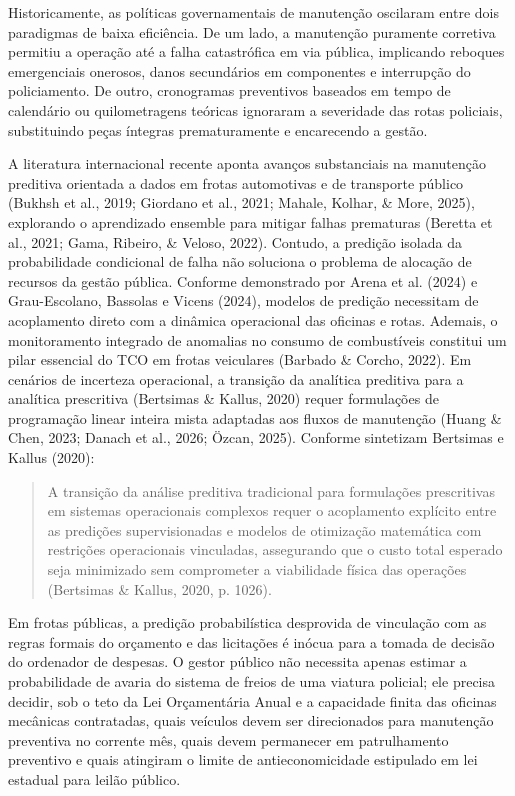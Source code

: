 \documentclass[12pt,a4paper]{article}
\begin{document}
Historicamente, as políticas governamentais de manutenção oscilaram entre dois paradigmas de baixa eficiência. De um lado, a manutenção puramente corretiva permitiu a operação até a falha catastrófica em via pública, implicando reboques emergenciais onerosos, danos secundários em componentes e interrupção do policiamento. De outro, cronogramas preventivos baseados em tempo de calendário ou quilometragens teóricas ignoraram a severidade das rotas policiais, substituindo peças íntegras prematuramente e encarecendo a gestão.

A literatura internacional recente aponta avanços substanciais na manutenção preditiva orientada a dados em frotas automotivas e de transporte público (Bukhsh et al., 2019; Giordano et al., 2021; Mahale, Kolhar, \& More, 2025), explorando o aprendizado ensemble para mitigar falhas prematuras (Beretta et al., 2021; Gama, Ribeiro, \& Veloso, 2022). Contudo, a predição isolada da probabilidade condicional de falha não soluciona o problema de alocação de recursos da gestão pública. Conforme demonstrado por Arena et al. (2024) e Grau-Escolano, Bassolas e Vicens (2024), modelos de predição necessitam de acoplamento direto com a dinâmica operacional das oficinas e rotas. Ademais, o monitoramento integrado de anomalias no consumo de combustíveis constitui um pilar essencial do TCO em frotas veiculares (Barbado \& Corcho, 2022). Em cenários de incerteza operacional, a transição da analítica preditiva para a analítica prescritiva (Bertsimas \& Kallus, 2020) requer formulações de programação linear inteira mista adaptadas aos fluxos de manutenção (Huang \& Chen, 2023; Danach et al., 2026; Özcan, 2025). Conforme sintetizam Bertsimas e Kallus (2020):

\begin{quote}
\small A transição da análise preditiva tradicional para formulações prescritivas em sistemas operacionais complexos requer o acoplamento explícito entre as predições supervisionadas e modelos de otimização matemática com restrições operacionais vinculadas, assegurando que o custo total esperado seja minimizado sem comprometer a viabilidade física das operações (Bertsimas \& Kallus, 2020, p. 1026).
\end{quote}

Em frotas públicas, a predição probabilística desprovida de vinculação com as regras formais do orçamento e das licitações é inócua para a tomada de decisão do ordenador de despesas. O gestor público não necessita apenas estimar a probabilidade de avaria do sistema de freios de uma viatura policial; ele precisa decidir, sob o teto da Lei Orçamentária Anual e a capacidade finita das oficinas mecânicas contratadas, quais veículos devem ser direcionados para manutenção preventiva no corrente mês, quais devem permanecer em patrulhamento preventivo e quais atingiram o limite de antieconomicidade estipulado em lei estadual para leilão público.
\end{document}
